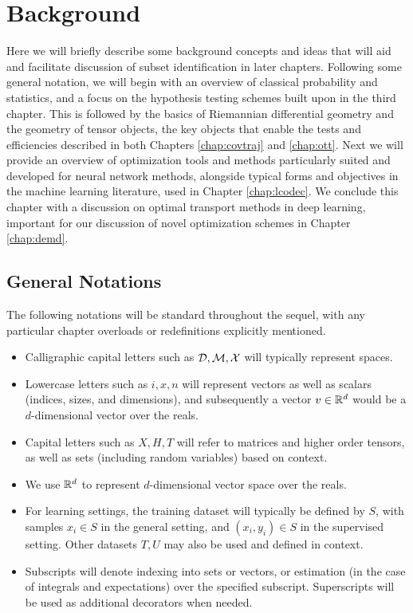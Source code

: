 \chapter{Background}\label{chap:bknd}
Here we will briefly describe some background concepts and ideas that will aid and facilitate discussion of subset identification in later chapters. 
Following some general notation,
we will begin with an overview
of classical probability and statistics,
and a focus on the hypothesis testing
schemes built upon in the third chapter.
This is followed by the basics of Riemannian differential geometry
and the geometry of tensor objects,
the key objects that enable the 
tests and efficiencies described in both 
Chapters \ref{chap:covtraj} and \ref{chap:ott}.
Next we will provide
an overview of optimization tools
and methods particularly suited
and developed for neural network methods,
alongside typical forms and objectives 
in the machine learning literature,
used in Chapter \ref{chap:lcodec}.
We conclude this chapter
with a discussion on optimal transport
methods in deep learning, important
for our discussion of novel optimization schemes
in Chapter \ref{chap:demd}.

\section{General Notations}
The following notations will be standard throughout the sequel, with any particular chapter overloads or redefinitions explicitly mentioned.
\begin{itemize}
\item Calligraphic capital letters such as $\mathcal{D}, \mathcal{M}, \mathcal{X}$ will typically represent spaces.

\item Lowercase letters such as $i,x,n$ will represent vectors as well as scalars (indices, sizes, and dimensions), and subsequently a vector $v \in \mathbb{R}^d$ would be a $d$-dimensional vector over the reals.

\item Capital letters such as $X,H,T$ will refer to matrices and higher order tensors, as well as sets (including random variables) based on context.

\item We use $\mathbb{R}^d$ to represent $d$-dimensional vector space over the reals.

\item For learning settings, the training dataset will typically be defined by $S$, with samples $x_i \in S$ in the general setting, and $(x_i,y_i)\in S$ in the supervised setting. Other datasets $T,U$ may also be used and defined in context.

\item Subscripts will denote indexing into sets or vectors, or estimation (in the case of integrals and expectations) over the specified subscript. Superscripts will be used as additional decorators when needed.

\end{itemize}

